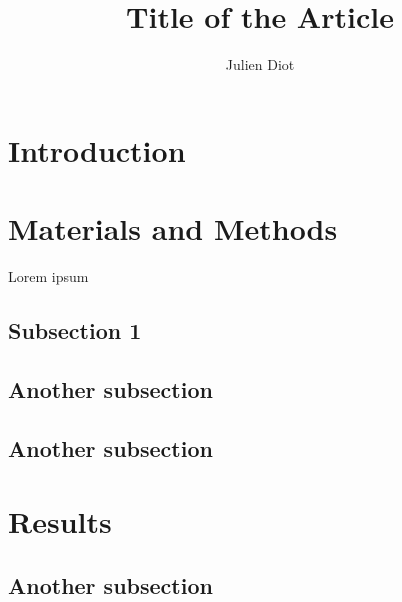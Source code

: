 \documentclass[a4paper, 10pt, conference]{article}
\title{Title of the Article}
\author{Julien Diot}
\begin{document}
\maketitle
\thispagestyle{content}
\pagestyle{content}


\begin{abstract}

\lipsum[1-1]



\end{abstract}


\begin{multicols}{2}

\section{Introduction}

\lipsum[1-2]

\section{Materials and Methods}
Lorem ipsum\cite{myRef1}

\subsection{Subsection 1}
\lipsum[1-5]


\subsection{Another subsection}

\lipsum[1-3]



\subsection{Another subsection}

\lipsum[1-4]


\section{Results}

\subsection{Another subsection}
\lipsum[1-4]


\end{multicols}
\end{document}
